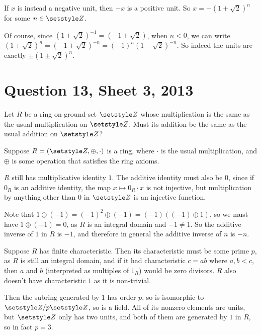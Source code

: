 \documentclass[fleqn,a4paper,11pt]{article}
\begin{document}
If \(x\) is instead a negative unit, then \(-x\) is a positive unit. So
\(x = -(1 + \sqrt 2)^n\) for some \(n \in \Z\).

Of course, since \((1 + \sqrt 2)^{-1} = (-1 + \sqrt 2)\), when \(n < 0\), we can
write \((1 + \sqrt 2)^n = (-1 + \sqrt 2)^{-n} = (-1)^n (1 - \sqrt 2)^{-n}\). So
indeed the units are exactly \(\pm(1 \pm \sqrt 2)^n\).

\section{Question 13, Sheet 3, 2013}

\begin{tcolorbox}
 Let \(R\) be a ring on ground-set \(\Z\) whose multiplication is the same as
 the usual multiplication on \(\Z\). Must its addition be the same as the usual
 addition on \(\Z\)?
\end{tcolorbox}

Suppose \(R = (\Z, \oplus, \cdot)\) is a ring, where \(\cdot\) is the usual
multiplication, and \(\oplus\) is some operation that satisfies the ring axioms.

\(R\) still has multiplicative identity \(1\). The additive identity must also
be \(0\), since if \(0_R\) is an additive identity, the map
\(x \mapsto 0_R \cdot x\) is not injective, but multiplication by anything
other than \(0\) in \(\Z\) is an injective function.

Note that
\(1 \oplus (-1) = (-1)^2 \oplus (-1) = (-1)((-1) \oplus 1)\), so we must have
\(1 \oplus (-1) = 0\), as \(R\) is an integral domain and \(-1 \ne 1\). So the
additive inverse of \(1\) in \(R\) is \(-1\), and therefore in general the
additive inverse of \(n\) is \(-n\).

Suppose \(R\) has finite characteristic. Then its characteristic must be some
prime \(p\), as \(R\) is still an integral domain, and if it had characteristic
\(c = ab\) where \(a, b < c\), then \(a\) and \(b\) (interpreted as multiples of
\(1_R\)) would be zero divisors. \(R\) also doesn't have characteristic \(1\) as
it is non-trivial.

Then the subring generated by \(1\) has order \(p\), so is isomorphic to
\(\Z/p\Z\), so is a field. All of its nonzero elements are units, but \(\Z\)
only has two units, and both of them are generated by \(1\) in \(R\), so in fact
\(p = 3\).
\end{document}
